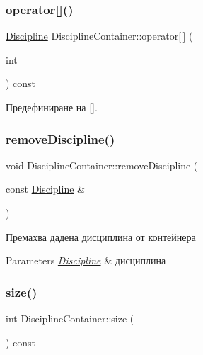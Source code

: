 \subsubsection{\texorpdfstring{operator[]()}{operator[]()}}
{\footnotesize\ttfamily \hyperlink{class_discipline}{Discipline} Discipline\+Container\+::operator\mbox{[}$\,$\mbox{]} (\begin{DoxyParamCaption}\item[{int}]{ }\end{DoxyParamCaption}) const}



Предефиниране на \mbox{[}\mbox{]}. 

\mbox{\label{class_discipline_container_a7c2ef60c5fa05157ad2b9e86f36b33ca}} 
\subsubsection{\texorpdfstring{remove\+Discipline()}{removeDiscipline()}}
{\footnotesize\ttfamily void Discipline\+Container\+::remove\+Discipline (\begin{DoxyParamCaption}\item[{const \hyperlink{class_discipline}{Discipline} \&}]{ }\end{DoxyParamCaption})}



Премахва дадена дисциплина от контейнера 


\begin{DoxyParams}{Parameters}
{\em \hyperlink{class_discipline}{Discipline}} & дисциплина \\
\hline
\end{DoxyParams}
\mbox{\label{class_discipline_container_a9ecb0f7eeed76342c004bbb4389353a5}} 
\subsubsection{\texorpdfstring{size()}{size()}}
{\footnotesize\ttfamily int Discipline\+Container\+::size (\begin{DoxyParamCaption}{ }\end{DoxyParamCaption}) const}

